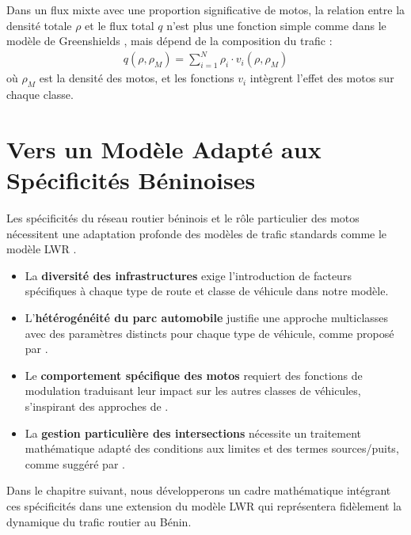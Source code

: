 \begin{proposition}
Dans un flux mixte avec une proportion significative de motos, la relation entre la densité totale $\rho$ et le flux total $q$ n'est plus une fonction simple comme dans le modèle de Greenshields \cite{greenshields1935study}, mais dépend de la composition du trafic :
\begin{align}
q(\rho, \rho_M) = \sum_{i=1}^N \rho_i \cdot v_i(\rho, \rho_M)
\end{align}
où $\rho_M$ est la densité des motos, et les fonctions $v_i$ intègrent l'effet des motos sur chaque classe.
\end{proposition}

\section{Vers un Modèle Adapté aux Spécificités Béninoises}
\label{sec:vers_modele_adapte}

Les spécificités du réseau routier béninois et le rôle particulier des motos nécessitent une adaptation profonde des modèles de trafic standards comme le modèle LWR \cite{lighthill1955kinematic, richards1956shock}.

\begin{itemize}
\item La \textbf{diversité des infrastructures} exige l'introduction de facteurs spécifiques à chaque type de route et classe de véhicule dans notre modèle.

\item L'\textbf{hétérogénéité du parc automobile} justifie une approche multiclasses avec des paramètres distincts pour chaque type de véhicule, comme proposé par \cite{wong2002multi}.

\item Le \textbf{comportement spécifique des motos} requiert des fonctions de modulation traduisant leur impact sur les autres classes de véhicules, s'inspirant des approches de \cite{zhang2003non}.

\item La \textbf{gestion particulière des intersections} nécessite un traitement mathématique adapté des conditions aux limites et des termes sources/puits, comme suggéré par \cite{daganzo1995cell}.
\end{itemize}

Dans le chapitre suivant, nous développerons un cadre mathématique intégrant ces spécificités dans une extension du modèle LWR qui représentera fidèlement la dynamique du trafic routier au Bénin.
